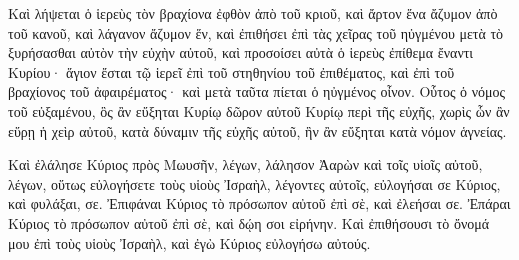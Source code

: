 {\par }{\PP {}Καὶ λήψεται ὁ ἱερεὺς τὸν βραχίονα ἐφθὸν ἀπὸ τοῦ κριοῦ, καὶ ἄρτον ἕνα ἄζυμον ἀπὸ τοῦ κανοῦ, καὶ λάγανον ἄζυμον ἕν, καὶ ἐπιθήσει ἐπὶ τὰς χεῖρας τοῦ ηὐγμένου μετὰ τὸ ξυρήσασθαι αὐτὸν τὴν εὐχὴν αὐτοῦ,
καὶ προσοίσει αὐτὰ ὁ ἱερεὺς ἐπίθεμα ἔναντι Κυρίου· ἅγιον ἔσται τῷ ἱερεῖ ἐπὶ τοῦ στηθηνίου τοῦ ἐπιθέματος, καὶ ἐπὶ τοῦ βραχίονος τοῦ ἀφαιρέματος· καὶ μετὰ ταῦτα πίεται ὁ ηὐγμένος οἶνον.
Οὗτος ὁ νόμος τοῦ εὐξαμένου, ὃς ἂν εὔξηται Κυρίῳ δῶρον αὐτοῦ Κυρίῳ περὶ τῆς εὐχῆς, χωρὶς ὧν ἂν εὕρῃ ἡ χεὶρ αὐτοῦ, κατὰ δύναμιν τῆς εὐχῆς αὐτοῦ, ἣν ἂν εὔξηται κατὰ νόμον ἁγνείας.
\par }{\PP {}Καὶ ἐλάλησε Κύριος πρὸς Μωυσῆν, λέγων,
λάλησον Ἀαρὼν καὶ τοῖς υἱοῖς αὐτοῦ, λέγων, οὕτως εὐλογήσετε τοὺς υἱοὺς Ἰσραὴλ, λέγοντες αὐτοῖς,
εὐλογήσαι σε Κύριος, καὶ φυλάξαι, σε.
Ἐπιφάναι Κύριος τὸ πρόσωπον αὐτοῦ ἐπὶ σὲ, καὶ ἐλεήσαι σε.
Ἐπάραι Κύριος τὸ πρόσωπον αὐτοῦ ἐπὶ σὲ, καὶ δῴη σοι εἰρήνην.
Καὶ ἐπιθήσουσι τὸ ὄνομά μου ἐπὶ τοὺς υἱοὺς Ἰσραὴλ, καὶ ἐγὼ Κύριος εὐλογήσω αὐτούς.

}
